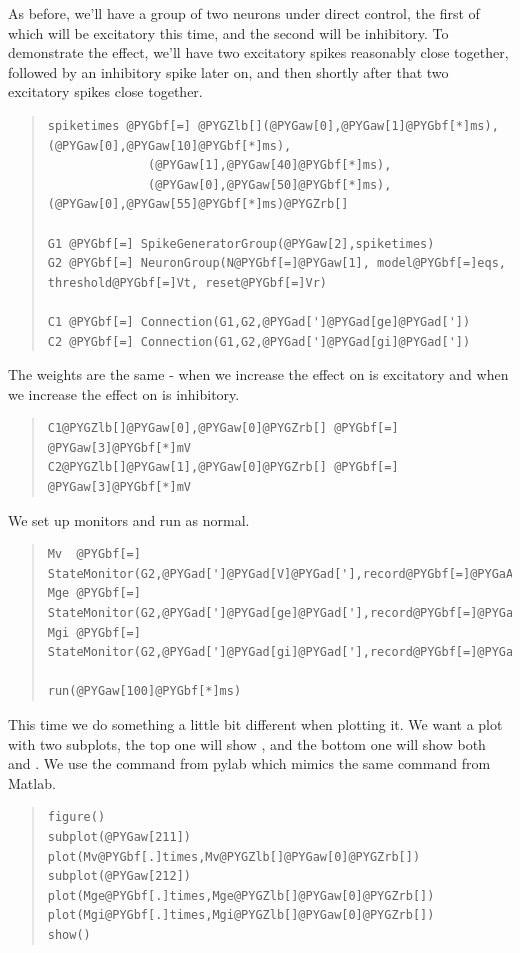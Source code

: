 \documentclass[letterpaper,10pt,english]{manual}
\begin{document}
As before, we'll have a group of two neurons under direct control, the first
of which will be excitatory this time, and the second will be inhibitory. To
demonstrate the effect, we'll have two excitatory spikes reasonably close
together, followed by an inhibitory spike later on, and then shortly after
that two excitatory spikes close together.
\begin{quote}

\begin{Verbatim}[commandchars=@\[\]]
spiketimes @PYGbf[=] @PYGZlb[](@PYGaw[0],@PYGaw[1]@PYGbf[*]ms),(@PYGaw[0],@PYGaw[10]@PYGbf[*]ms),
              (@PYGaw[1],@PYGaw[40]@PYGbf[*]ms),
              (@PYGaw[0],@PYGaw[50]@PYGbf[*]ms),(@PYGaw[0],@PYGaw[55]@PYGbf[*]ms)@PYGZrb[]

G1 @PYGbf[=] SpikeGeneratorGroup(@PYGaw[2],spiketimes)
G2 @PYGbf[=] NeuronGroup(N@PYGbf[=]@PYGaw[1], model@PYGbf[=]eqs, threshold@PYGbf[=]Vt, reset@PYGbf[=]Vr)

C1 @PYGbf[=] Connection(G1,G2,@PYGad[']@PYGad[ge]@PYGad['])
C2 @PYGbf[=] Connection(G1,G2,@PYGad[']@PYGad[gi]@PYGad['])
\end{Verbatim}
\end{quote}

The weights are the same - when we increase  the effect on  is excitatory
and when we increase  the effect on  is inhibitory.
\begin{quote}

\begin{Verbatim}[commandchars=@\[\]]
C1@PYGZlb[]@PYGaw[0],@PYGaw[0]@PYGZrb[] @PYGbf[=] @PYGaw[3]@PYGbf[*]mV
C2@PYGZlb[]@PYGaw[1],@PYGaw[0]@PYGZrb[] @PYGbf[=] @PYGaw[3]@PYGbf[*]mV
\end{Verbatim}
\end{quote}

We set up monitors and run as normal.
\begin{quote}

\begin{Verbatim}[commandchars=@\[\]]
Mv  @PYGbf[=] StateMonitor(G2,@PYGad[']@PYGad[V]@PYGad['],record@PYGbf[=]@PYGaA[True])
Mge @PYGbf[=] StateMonitor(G2,@PYGad[']@PYGad[ge]@PYGad['],record@PYGbf[=]@PYGaA[True])
Mgi @PYGbf[=] StateMonitor(G2,@PYGad[']@PYGad[gi]@PYGad['],record@PYGbf[=]@PYGaA[True])

run(@PYGaw[100]@PYGbf[*]ms)
\end{Verbatim}
\end{quote}

This time we do something a little bit different when plotting it. We want
a plot with two subplots, the top one will show , and the bottom one will
show both  and . We use the  command from pylab which mimics the
same command from Matlab.
\begin{quote}

\begin{Verbatim}[commandchars=@\[\]]
figure()
subplot(@PYGaw[211])
plot(Mv@PYGbf[.]times,Mv@PYGZlb[]@PYGaw[0]@PYGZrb[])
subplot(@PYGaw[212])
plot(Mge@PYGbf[.]times,Mge@PYGZlb[]@PYGaw[0]@PYGZrb[])
plot(Mgi@PYGbf[.]times,Mgi@PYGZlb[]@PYGaw[0]@PYGZrb[])
show()
\end{Verbatim}
\end{quote}
\end{document}

